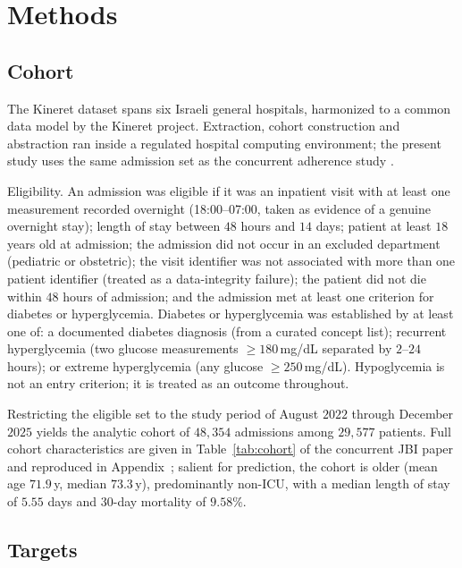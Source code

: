 \section{Methods}
\label{sec:methods}

\subsection{Cohort}
\label{sec:methods-cohort}

The Kineret dataset spans six Israeli general hospitals, harmonized to a
common data model by the Kineret project. Extraction, cohort construction
and abstraction ran inside a regulated hospital computing environment; the
present study uses the same admission set as the concurrent adherence
study \citep{oded2027kineret-jbi}.

Eligibility. An admission was eligible if it was an inpatient visit with
at least one measurement recorded overnight (18:00--07:00, taken as
evidence of a genuine overnight stay); length of stay between $48$ hours
and $14$ days; patient at least $18$ years old at admission; the admission
did not occur in an excluded department (pediatric or obstetric); the
visit identifier was not associated with more than one patient identifier
(treated as a data-integrity failure); the patient did not die within
$48$ hours of admission; and the admission met at least one criterion for
diabetes or hyperglycemia. Diabetes or hyperglycemia was established by
at least one of: a documented diabetes diagnosis (from a curated concept
list); recurrent hyperglycemia (two glucose measurements $\ge 180$\,mg/dL
separated by $2$--$24$ hours); or extreme hyperglycemia (any glucose
$\ge 250$\,mg/dL). Hypoglycemia is not an entry criterion; it is treated
as an outcome throughout.

Restricting the eligible set to the study period of August $2022$ through
December $2025$ yields the analytic cohort of $48{,}354$ admissions among
$29{,}577$ patients. Full cohort characteristics are given in
Table~\ref{tab:cohort} of the concurrent JBI paper
\citep{oded2027kineret-jbi} and reproduced in Appendix~; salient for prediction, the cohort is
older (mean age $71.9$\,y, median $73.3$\,y), predominantly non-ICU, with
a median length of stay of $5.55$ days and $30$-day mortality of
$9.58\%$.

\subsection{Targets}
\label{sec:methods-targets}

